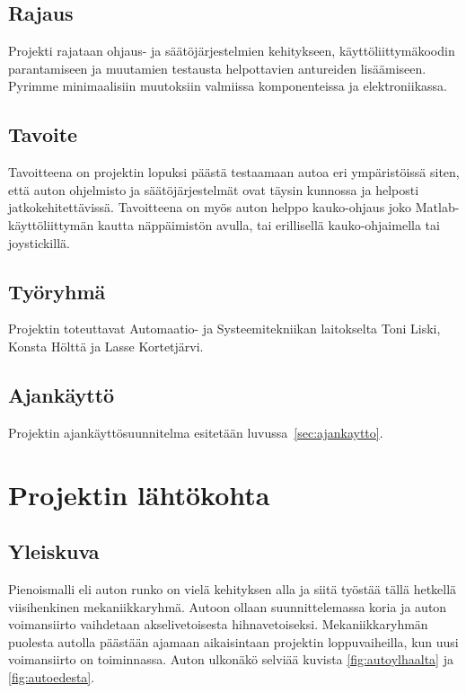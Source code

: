 \documentclass{article}
\begin{document}
\subsection{Rajaus}

Projekti rajataan ohjaus- ja säätöjärjestelmien kehitykseen, käyttöliittymäkoodin parantamiseen ja muutamien testausta helpottavien antureiden lisäämiseen. Pyrimme minimaalisiin muutoksiin valmiissa komponenteissa ja elektroniikassa.

\subsection{Tavoite}

Tavoitteena on projektin lopuksi päästä testaamaan autoa eri ympäristöissä siten, että auton ohjelmisto ja säätöjärjestelmät ovat täysin kunnossa ja helposti jatkokehitettävissä. Tavoitteena on myös auton helppo kauko-ohjaus joko Matlab-käyttöliittymän kautta näppäimistön avulla, tai erillisellä kauko-ohjaimella tai joystickillä.

\subsection{Työryhmä}

Projektin toteuttavat Automaatio- ja Systeemitekniikan laitokselta Toni Liski, Konsta Hölttä ja Lasse Kortetjärvi.

\subsection{Ajankäyttö}

Projektin ajankäyttösuunnitelma esitetään luvussa~\ref{sec:ajankaytto}.

\section{Projektin lähtökohta}

\subsection{Yleiskuva}

Pienoismalli eli auton runko on vielä kehityksen alla ja siitä työstää tällä hetkellä viisihenkinen mekaniikkaryhmä. Autoon ollaan suunnittelemassa koria ja auton voimansiirto vaihdetaan akselivetoisesta hihnavetoiseksi. Mekaniikkaryhmän puolesta autolla päästään ajamaan aikaisintaan projektin loppuvaiheilla, kun uusi voimansiirto on toiminnassa. Auton ulkonäkö selviää kuvista \ref{fig:autoylhaalta} ja \ref{fig:autoedesta}.
\end{document}
